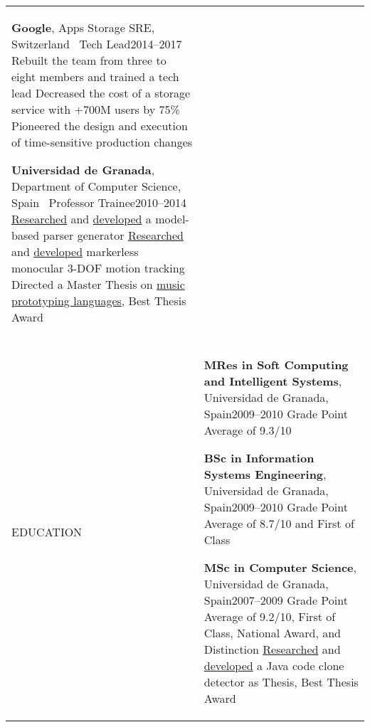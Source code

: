 \documentclass[letterpaper,10pt,oneside]{article}
\newcommand{\DatestampY}[1]{#1}
\newenvironment{body}
{\par\par
\begin{longtable}{p{0.142\textwidth}p{0.807\textwidth}}}
{\par\end{longtable}\par}
\renewcommand{\section}[3]{\\[-0.6cm]\pdfbookmark[2]{#2}{#3}\\%
\raggedleft  %
{\fontsize{9.5pt}{9.5pt}\selectfont\bfseries\raggedright%
\MakeUppercase{#1}}&}
\newcommand{\SmallEntryGap}{\par\vspace{0.27em}\par}
\begin{document}
\begin{body}
\SmallEntryGap

\textbf{Google}, Apps Storage SRE, Switzerland \textemdash\ Tech Lead\hfill \DatestampY{2014}--\DatestampY{2017}\newline
\phantom{w}Rebuilt the team from three to eight members and trained a tech lead\newline
\phantom{w}Decreased the cost of a storage service with +700M users by 75\%\newline
\phantom{w}Pioneered the design and execution of time-sensitive production changes

\SmallEntryGap

\textbf{Universidad de Granada}, Department of Computer Science, Spain \textemdash\ Professor Trainee\hfill \DatestampY{2010}--\DatestampY{2014} \newline
\phantom{w}\href{https://doi.org/10.1142/S0218194014500375}{Researched} and \href{https://github.com/lquesada/ModelCC}{developed} a model-based parser generator \newline
\phantom{w}\href{https://doi.org/10.1142/S0129065712500190}{Researched} and \href{https://github.com/lquesada/MotionTracking}{developed} markerless monocular 3-DOF motion tracking \newline
\phantom{w}Directed a Master Thesis on \href{https://github.com/lquesada/ADAgio}{music prototyping languages}, Best Thesis Award


\section{Education}{Education}{PDF:Education}

\textbf{MRes in Soft Computing and Intelligent Systems}, Universidad de Granada, Spain\hfill \DatestampY{2009}--\DatestampY{2010} \newline
\phantom{w}Grade Point Average of 9.3/10

\SmallEntryGap

\textbf{BSc in Information Systems Engineering}, Universidad de Granada, Spain\hfill \DatestampY{2009}--\DatestampY{2010} \newline
\phantom{w}Grade Point Average of 8.7/10 and First of Class

\SmallEntryGap

\textbf{MSc in Computer Science}, Universidad de Granada, Spain\hfill \DatestampY{2007}--\DatestampY{2009} \newline
\phantom{w}Grade Point Average of 9.2/10, First of Class, National Award, and Distinction \newline
\phantom{w}\href{https://doi.org/10.5220/0003013403330336}{Researched} and \href{https://github.com/lquesada/JSimil}{developed} a Java code clone detector as Thesis, Best Thesis Award


\end{body}
\end{document}
